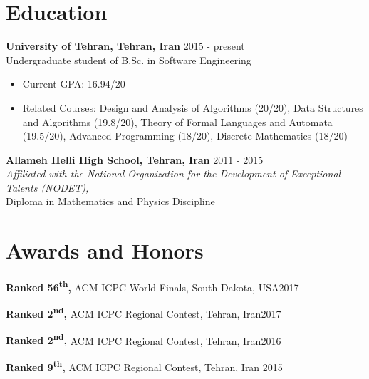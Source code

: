 \documentclass[margin]{res}
\begin{document}
 
 
 
\address{No. 14, Tanhajou Street, \\Tehranpars 3rd Square, \\Tehran, Iran}
\address{shayan.hosseini@ut.ac.ir \\ www.shayanh.ir \\ Cell: +98-919-6421171}

 
\begin{resume} 

\section{Education}
    {\bf University of Tehran, Tehran, Iran} \hfill 2015 - present
    \\Undergraduate student of B.Sc. in Software Engineering
    
   	\begin{itemize}
	\item Current GPA: 16.94/20
	\item Related Courses: Design and Analysis of Algorithms (20/20), Data Structures and Algorithms (19.8/20),
	Theory of Formal Languages and Automata (19.5/20), Advanced Programming (18/20), Discrete Mathematics (18/20)
	\end{itemize}

    {\bf Allameh Helli High School, Tehran, Iran} \hfill 2011 - 2015
    \\\textit{\scriptsize Affiliated with the National Organization for the Development of Exceptional Talents (NODET),}
    \\Diploma in Mathematics and Physics Discipline

\section{Awards and Honors}
	{\bf Ranked 56\textsuperscript{th},} ACM ICPC World Finals, South Dakota, USA\hfill 2017

	{\bf Ranked 2\textsuperscript{nd},} ACM ICPC Regional Contest, Tehran, Iran\hfill 2017

	{\bf Ranked 2\textsuperscript{nd},} ACM ICPC Regional Contest, Tehran, Iran\hfill 2016

    {\bf Ranked 9\textsuperscript{th},} ACM ICPC Regional Contest, Tehran, Iran \hfill 2015


\end{resume}
\end{document}
